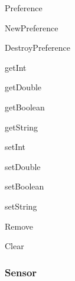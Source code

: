 \begin{DoxyItemize}
\item Preference
\begin{DoxyItemize}
\item New\-Preference
\item Destroy\-Preference
\item get\-Int
\item get\-Double
\item get\-Boolean
\item get\-String
\item set\-Int
\item set\-Double
\item set\-Boolean
\item set\-String
\item Remove
\item Clear
\end{DoxyItemize}
\end{DoxyItemize}

\subsubsection*{Sensor}


